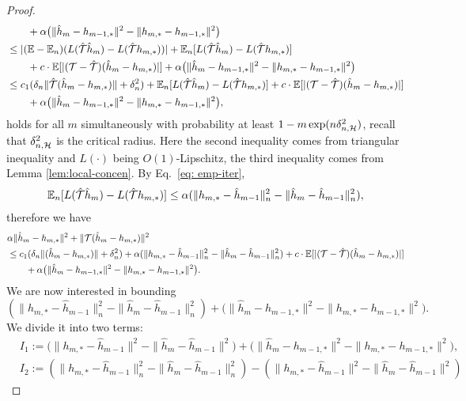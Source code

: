 \begin{proof}
\begin{align*}
    &\qquad+ \alpha\big(\|\hat{h}_{m} - h_{m-1,*}\|^2 - \|h_{m,*} - h_{m-1,*}\|^2\big)\\
    & \leq |(\mathbb{E} - \mathbb{E}_n)(L(\hat{{\mathcal{T}}}\hat{h}_{m}) - L(\hat{{\mathcal{T}}} h_{m,*}) )| + \mathbb{E}_n[L(\hat{{\mathcal{T}}}\hat{h}_{m}) - L(\hat{{\mathcal{T}}} h_{m,*})] \\
    &\qquad+ c\cdot\mathbb{E}[|({\mathcal{T}} - \hat{{\mathcal{T}}})(\hat{h}_{m} - h_{m,*})|] +  \alpha\big(\|\hat{h}_{m} - h_{m-1,*}\|^2 - \|h_{m,*} - h_{m-1,*}\|^2\big)\\
    &\leq c_1 (\delta_n\|\hat{{\mathcal{T}}}(\hat{h}_{m} - h_{m,*})\| + \delta_n^2)+ \mathbb{E}_n[L(\hat{{\mathcal{T}}}\hat{h}_{m}) - L(\hat{{\mathcal{T}}} h_{m,*})] + c \cdot \mathbb{E}[|({\mathcal{T}} - \hat{{\mathcal{T}}})(\hat{h}_{m} - h_{m,*})|] \\
    &\qquad +  \alpha\big(\|\hat{h}_{m} - h_{m-1,*}\|^2 - \|h_{m,*} - h_{m-1,*}\|^2\big),\\
\end{align*}
holds for all $m$ simultaneously with probability at least $1- m \exp(n\delta_{n,\mathcal{H}}^2)$, recall that $\delta_{n,\mathcal{H}}^2$ is the critical radius.  Here the second inequality comes from triangular inequality and $L(\cdot)$ being $O(1)$-Lipschitz, the third inequality comes from  Lemma \ref{lem:local-concen}.
By Eq.~\eqref{eq: emp-iter},  $$
 \mathbb{E}_n[L(\hat{{\mathcal{T}}}\hat{h}_{m}) - L(\hat{{\mathcal{T}}} h_{m,*})] \leq  \alpha(\|h_{m,*} - \hat{h}_{m-1}\|^2_n - \|\hat{h}_{m} - \hat{h}_{m-1}\|^2_n),
$$
therefore we have \begin{align*}
&\alpha \|\hat{h}_{m} - h_{m,*}\|^2 + \|{\mathcal{T}}(\hat{h}_{m} - h_{m,*})\|^2\\
&\leq c_1 (\delta_n\|(\hat{h}_{m} - h_{m,*})\| + \delta_n^2) + \alpha(\|h_{m,*} - \hat{h}_{m-1}\|^2_n - \|\hat{h}_{m} - \hat{h}_{m-1}\|^2_n) + c \cdot \mathbb{E}[|({\mathcal{T}} - \hat{{\mathcal{T}}})(\hat{h}_{m} - h_{m,*})|] \\
&\qquad +  \alpha\big(\|\hat{h}_{m} - h_{m-1,*}\|^2 - \|h_{m,*} - h_{m-1,*}\|^2\big).
\end{align*}
We are now interested in bounding 
$$
(\|h_{m,*} - \hat{h}_{m-1}\|^2_n - \|\hat{h}_{m} - \hat{h}_{m-1}\|^2_n) +\big(\|\hat{h}_{m} - h_{m-1,*}\|^2 - \|h_{m,*} - h_{m-1,*}\|^2\big).
$$
We divide it into two terms:\begin{align*}
    &I_1 := \big(\|h_{m,*} - \hat{h}_{m-1}\|^2 - \|\hat{h}_{m} - \hat{h}_{m-1}\|^2\big) + \big(\|\hat{h}_{m} - h_{m-1,*}\|^2 - \|h_{m,*} - h_{m-1,*}\|^2\big),\\
    &I_2 := (\|h_{m,*} - \hat{h}_{m-1}\|^2_n - \|\hat{h}_{m} - \hat{h}_{m-1}\|^2_n) - (\|h_{m,*} - \hat{h}_{m-1}\|^2 - \|\hat{h}_{m} - \hat{h}_{m-1}\|^2)

\end{align*}
\end{proof}
